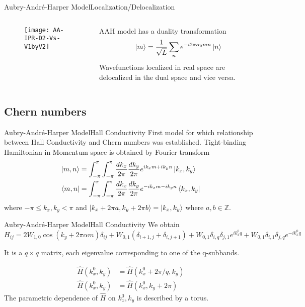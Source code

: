 \documentclass{beamer}
\begin{document}
\begin{frame}{Aubry-Andr\'e-Harper Model}{Localization/Delocalization}
 \begin{columns}
  \begin{column}{0.5\textwidth}
    \begin{figure}[h]
      \texttt{[image: AA-IPR-D2-Vs-V1byV2]}
      \centering
      \end{figure}
  \end{column}
  \begin{column}{0.5\textwidth}
   AAH model has a duality transformation
    \begin{equation*}
    \ket{m} = \frac{1}{\sqrt{L}}\sum_{n}e^{-i2\pi\alpha_0 m n} \ket{n}
    \end{equation*}
    Wavefunctions localized in real space are delocalized in the dual space and vice versa.
  \end{column}
 \end{columns}
\end{frame}

\subsection{Chern numbers}
\begin{frame}{Aubry-Andr\'e-Harper Model}{Hall Conductivity}
First model for which relationship between Hall Conductivity and Chern numbers was established.
Tight-binding Hamiltonian in Momentum space is obtained by Fourier transform
\begin{align}
 \ket{m, n} &= \int_{-\pi}^{\pi}\int_{-\pi}^{\pi}\frac{dk_{x}}{2\pi}\frac{dk_{y}}{2\pi}e^{ik_xm+ik_yn}\ket{k_x, k_y} \\
 \bra{m, n} &= \int_{-\pi}^{\pi}\int_{-\pi}^{\pi}\frac{dk_{x}}{2\pi}\frac{dk_{y}}{2\pi}e^{-ik_xm-ik_yn}\bra{k_x, k_y}
\end{align} \small where $-\pi \leq k_x, k_y < \pi$ and $\ket{k_x + 2\pi a, k_y + 2\pi b} = \ket{k_x, k_y}$ where $a, b \in \mathbb{Z}$. \normalsize
\end{frame}

\begin{frame}{Aubry-Andr\'e-Harper Model}{Hall Conductivity}
 We obtain \footnotesize
  \begin{equation*}
    H_{ij} = 2W_{1,0} \cos(k_y + 2\pi\alpha m) \delta_{ij} + W_{0,1} (\delta_{i+1, j} + \delta_{i, j+1}) + W_{0,1}\delta_{i,q}\delta_{j,1} e^{ik_{x}^0 q} + W_{0,1}\delta_{i,1}\delta_{j,q} e^{-ik_{x}^0 q}
  \end{equation*} \normalsize
  
  It is a $q \times q$ matrix, each eigenvalue corresponding to one of the q-subbands.
  
  \begin{align*}
    \hat{H}(k_{x}^0, k_y) &= \hat{H}(k_{x}^0 + 2\pi/q, k_y) \\
    \hat{H}(k_{x}^0, k_y) &= \hat{H}(k_{x}^0, k_y+2\pi)
  \end{align*} The parametric dependence of $\hat{H}$ on $k_x^0 , k_y$ is described by a torus.
\end{frame}
\end{document}
